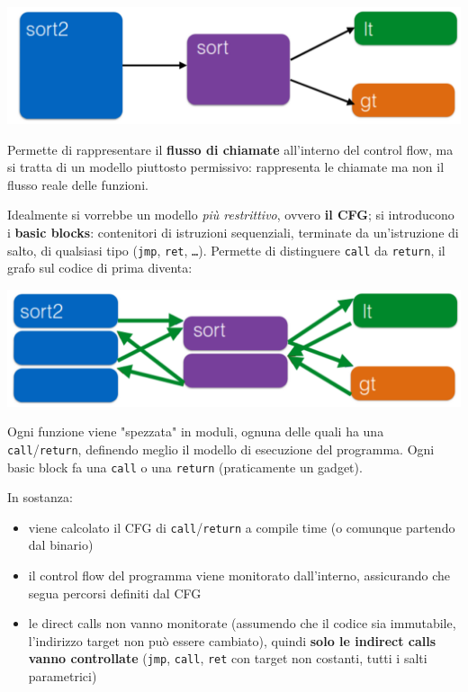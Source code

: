 \begin{center}
	\includegraphics[width=0.8\linewidth]{img/cfi/call1}
\end{center}

Permette di rappresentare il \textbf{flusso di chiamate} all'interno del control flow, ma si tratta di un modello piuttosto permissivo: rappresenta le chiamate ma non il flusso reale delle funzioni.

Idealmente si vorrebbe un modello \textit{più restrittivo}, ovvero \textbf{il CFG}; si introducono i \textbf{basic blocks}: contenitori di istruzioni sequenziali, terminate da un'istruzione di salto, di qualsiasi tipo (\texttt{jmp}, \texttt{ret}, \texttt{\dots}). Permette di distinguere \texttt{call} da \texttt{return}, il grafo sul codice di prima diventa:
\begin{center}
	\includegraphics[width=0.8\linewidth]{img/cfi/call2}
\end{center}

Ogni funzione viene "spezzata" in moduli, ognuna delle quali ha una \texttt{call}/\texttt{return}, definendo meglio il modello di esecuzione del programma. Ogni basic block fa una \texttt{call} o una \texttt{return} (praticamente un gadget). 

In sostanza:
\begin{itemize}
	\item viene calcolato il CFG di \texttt{call}/\texttt{return} a compile time (o comunque partendo dal binario)

	\item il control flow del programma viene monitorato dall'interno, assicurando che segua percorsi definiti dal CFG

	\item le direct calls non vanno monitorate (assumendo che il codice sia immutabile, l'indirizzo target non può essere cambiato), quindi \textbf{solo le indirect calls vanno controllate} (\texttt{jmp}, \texttt{call}, \texttt{ret} con target non costanti, tutti i salti parametrici)
\end{itemize}


